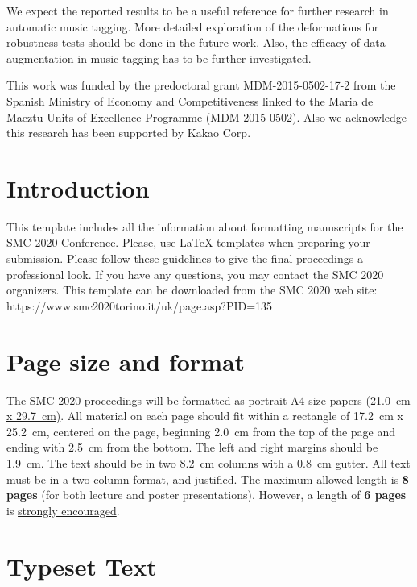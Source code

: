 \documentclass{article}
\begin{document}
We expect the reported results to be a useful reference for further research in automatic music tagging.
More detailed exploration of the deformations for robustness tests should be done in the future work. Also, the efficacy of data augmentation in music tagging has to be further investigated.




 \begin{acknowledgments}
This work was funded by the predoctoral grant MDM-2015-0502-17-2 from the Spanish Ministry of Economy and Competitiveness linked to the Maria de Maeztu Units of Excellence Programme (MDM-2015-0502). Also we acknowledge this research has been supported by Kakao Corp.
\end{acknowledgments} 



\iffalse
\section{Introduction}\label{sec:introduction}
This template includes all the information about formatting manuscripts for 
the SMC 2020 Conference.
Please, use \LaTeX{} templates when 
preparing your submission.
Please follow these guidelines to give the final proceedings a professional look.
If you have any questions, you may contact the SMC 2020 organizers.
This template can be downloaded from the SMC 2020 web site:\\
https://www.smc2020torino.it/uk/page.asp?PID=135

\section{Page size and format}
\label{sec:page_size}
The SMC 2020 proceedings will be formatted as portrait \underline{A4-size papers (21.0~cm x 29.7~cm)}. All material on each page should fit within a rectangle of 17.2~cm x 25.2~cm, centered on the page, beginning 2.0~cm from the top of the page and ending with 2.5~cm from the bottom. The left and right margins should be 1.9~cm. The text should be in two 8.2~cm columns with a 0.8~cm gutter. All text must be in a two-column format, and justified.
The maximum allowed length is {\bf8 pages} (for both lecture and poster presentations). However, a length of {\bf6 pages} is \underline{strongly encouraged}.


\section{Typeset Text}\label{sec:typeset_text}
\end{document}
